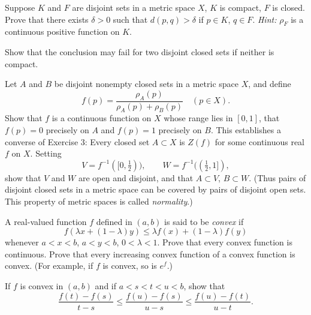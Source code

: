 \begin{questions}

  \question Suppose $K$ and $F$ are disjoint sets in a metric space $X$, $K$ is compact, $F$ is closed. Prove that there exists $\delta>0$ such that $d(p,q)>\delta$ if $p\in K$, $q\in F$. \emph{Hint:} $\rho_F$ is a continuous positive function on $K$.

  Show that the conclusion may fail for two disjoint closed sets if neither is compact.

  \question Let $A$ and $B$ be disjoint nonempty closed sets in a metric space $X$, and define
  \[ f(p) = \frac{\rho_A(p)}{\rho_A(p) + \rho_B(p)} \quad (p\in X). \]
  Show that $f$ is a continuous function on $X$ whose range lies in $[0,1]$, that $f(p)=0$ precisely on $A$ and $f(p)=1$ precisely on $B$. This establishes a converse of Exercise 3: Every closed set $A\subset X$ is $Z(f)$ for some continuous real $f$ on $X$. Setting
  \[ V=f^{-1}([0,\tfrac{1}{2})), \qquad W = f^{-1}((\tfrac{1}{2},1]), \]
  show that $V$ and $W$ are open and disjoint, and that $A\subset V$, $B\subset W$. (Thus pairs of disjoint closed sets in a metric space can be covered by pairs of disjoint open sets. This property of metric spaces is called \emph{normality}.)

  \question A real-valued function $f$ defined in $(a,b)$ is said to be \emph{convex} if
  \[ f(\lambda x + (1-\lambda)y) \leq \lambda f(x) + (1-\lambda)f(y) \]
  whenever $a<x<b$, $a<y<b$, $0<\lambda<1$. Prove that every convex function is continuous. Prove that every increasing convex function of a convex function is convex. (For example, if $f$ is convex, so is $e^f$.)

  If $f$ is convex in $(a,b)$ and if $a<s<t<u<b$, show that
  \[ \frac{f(t)-f(s)}{t-s} \leq \frac{f(u)-f(s)}{u-s} \leq \frac{f(u)-f(t)}{u-t}. \]


\end{questions}
